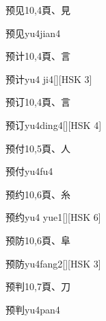 \begin{Entry}{预见}{10,4}{⾴、⾒}
  \begin{Phonetics}{预见}{yu4jian4}
  \end{Phonetics}
\end{Entry}

\begin{Entry}{预计}{10,4}{⾴、⾔}
  \begin{Phonetics}{预计}{yu4 ji4}[][HSK 3]
  \end{Phonetics}
\end{Entry}

\begin{Entry}{预订}{10,4}{⾴、⾔}
  \begin{Phonetics}{预订}{yu4ding4}[][HSK 4]
  \end{Phonetics}
\end{Entry}

\begin{Entry}{预付}{10,5}{⾴、⼈}
  \begin{Phonetics}{预付}{yu4fu4}
  \end{Phonetics}
\end{Entry}

\begin{Entry}{预约}{10,6}{⾴、⽷}
  \begin{Phonetics}{预约}{yu4 yue1}[][HSK 6]
  \end{Phonetics}
\end{Entry}

\begin{Entry}{预防}{10,6}{⾴、⾩}
  \begin{Phonetics}{预防}{yu4fang2}[][HSK 3]
  \end{Phonetics}
\end{Entry}

\begin{Entry}{预判}{10,7}{⾴、⼑}
  \begin{Phonetics}{预判}{yu4pan4}
  \end{Phonetics}
\end{Entry}


